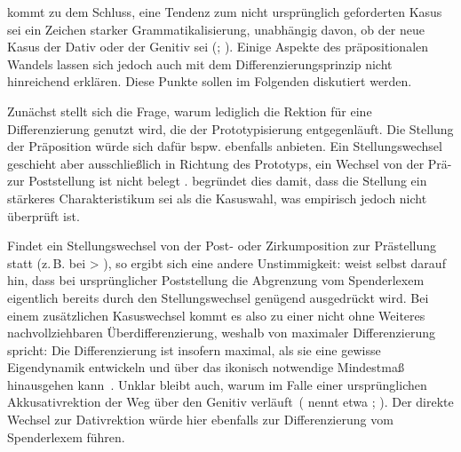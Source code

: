 \citet[348]{DiMeola1999} kommt zu dem Schluss, eine Tendenz zum nicht ursprünglich geforderten Kasus sei ein Zeichen starker Grammatikalisierung, unabhängig davon, ob der neue Kasus der Dativ oder der Genitiv sei (\citealp[s. auch][162]{DiMeola2000}; \citealp[220]{DiMeola2003}). 
Einige Aspekte des präpositionalen Wandels lassen sich jedoch auch mit dem Differenzierungsprinzip nicht hinreichend erklären. 
Diese Punkte sollen im Folgenden diskutiert werden. 

Zunächst stellt sich die Frage, warum lediglich die Rektion für eine Differenzierung genutzt wird, die der Prototypisierung entgegenläuft. 
Die Stellung der Präposition würde sich dafür bspw. ebenfalls anbieten. 
Ein Stellungswechsel geschieht aber ausschließlich in Richtung des Prototyps, ein Wechsel von der Prä- zur Poststellung ist nicht belegt \citep[s.][163]{DiMeola2000}. 
\citet[163]{DiMeola2000} begründet dies damit, dass die Stellung ein stärkeres Charakteristikum sei als die Kasuswahl, was empirisch jedoch nicht überprüft ist.

Findet ein Stellungswechsel von der Post- oder Zirkumposition zur Prästellung statt (z.\,B. bei  > ), so ergibt sich eine andere Unstimmigkeit:
\citet[144]{DiMeola2000} weist selbst darauf hin, dass bei urspr{\"u}nglicher Poststellung die Abgrenzung vom Spenderlexem eigentlich bereits durch den Stellungswechsel gen{\"u}gend ausgedr{\"u}ckt wird. 
Bei einem zusätzlichen Kasuswechsel kommt es also zu einer nicht ohne Weiteres nachvollziehbaren Überdifferenzierung, weshalb \citet{DiMeola2000} von \glqq maximaler Differenzierung\grqq{} spricht: 
\glqq Die Differenzierung ist insofern {\glq}maximal{\grq}, als sie eine gewisse Eigendynamik entwickeln und {\"u}ber das ikonisch {\glq}notwendige{\grq} Mindestma{\ss} hinausgehen kann\grqq{}~\citep[144]{DiMeola2000}. 
Unklar bleibt auch, warum im Falle einer urspr{\"u}nglichen Akkusativrektion der Weg {\"u}ber den Genitiv verl{\"a}uft~(\citealp[][421]{DiMeola2006} nennt etwa ; \citealp[vgl. auch][214]{DiMeola2009}). 
Der direkte Wechsel zur Dativrektion w{\"u}rde hier ebenfalls zur Differenzierung vom Spenderlexem f{\"u}hren. 

